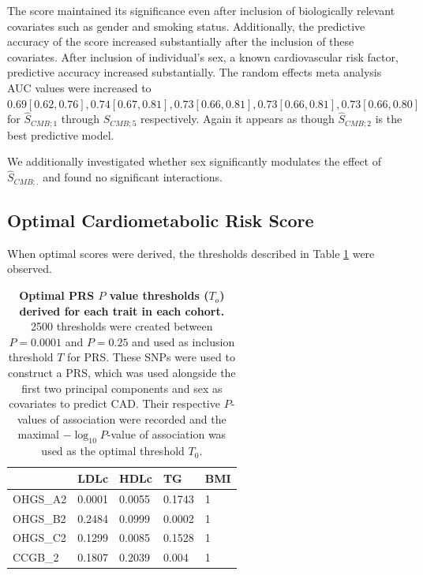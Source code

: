 The score maintained its significance even after inclusion of biologically relevant covariates such as gender and smoking status. Additionally, the predictive accuracy of the score increased substantially after the inclusion of these covariates. After inclusion of individual's sex, a known cardiovascular risk factor, predictive accuracy increased substantially. The random effects meta analysis \ac{AUC} values were increased to $0.69[0.62, 0.76], 0.74[0.67, 0.81], 0.73 [0.66, 0.81], 0.73[0.66, 0.81], 0.73[0.66, 0.80]$ for $\hat{S}_{CMB; 1}$ through $\hat{S}_{CMB; 5}$ respectively. Again it appears as though $\hat{S}_{CMB; 2}$ is the best predictive model.


We additionally investigated whether sex significantly modulates the effect of  $\hat{S}_{CMB; .}$ and found no significant interactions. 

\subsection{Optimal Cardiometabolic Risk Score}

When optimal scores were derived, the thresholds described in Table \ref{oprs} were observed.

\begin{table}[H]
\centering

\begin{tabular}{lllll}
\hline
                  & \textbf{LDLc} & \textbf{HDLc} & \textbf{TG} & \textbf{BMI} \\ \hline
OHGS\_A2 & 0.0001        & 0.0055        & 0.1743      & 1            \\
OHGS\_B2 & 0.2484        & 0.0999        & 0.0002      & 1            \\
OHGS\_C2 & 0.1299        & 0.0085        & 0.1528      & 1            \\
CCGB\_2  & 0.1807        & 0.2039        & 0.004       & 1            \\ \hline
\end{tabular}

\caption[Optimal \ac{PRS} $P$-value thresholds.]{\textbf{Optimal \ac{PRS} $P$ value thresholds ($T_o$) derived for each trait in each cohort.} 2500 thresholds were created between $P = 0.0001$ and $P = 0.25$ and used as inclusion threshold $T$ for \ac{PRS}. These \acp{SNP} were used to construct a \ac{PRS}, which was used alongside the first two principal components and sex as covariates to predict \ac{CAD}. Their respective $P$-values of association were recorded and the maximal $-\log_{10} P$-value of association was used as the optimal threshold $T_0$.}
\label{oprs}
\end{table}


